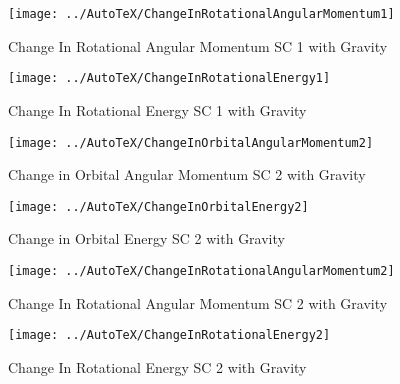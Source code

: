 \begin{figure}[htbp]
	\centerline{
		\texttt{[image: ../AutoTeX/ChangeInRotationalAngularMomentum1]}}
	\caption{Change In Rotational Angular Momentum SC 1 with Gravity}
	\label{fig:ChangeInRotationalAngularMomentum1}
\end{figure}

\begin{figure}[htbp]
	\centerline{
		\texttt{[image: ../AutoTeX/ChangeInRotationalEnergy1]}}
	\caption{Change In Rotational Energy SC 1 with Gravity}
	\label{fig:ChangeInRotationalEnergy1}
\end{figure}

\begin{figure}[htbp]
	\centerline{
		\texttt{[image: ../AutoTeX/ChangeInOrbitalAngularMomentum2]}}
	\caption{Change in Orbital Angular Momentum SC 2 with Gravity}
	\label{fig:ChangeInOrbitalAngularMomentum2}
\end{figure}

\begin{figure}[htbp]
	\centerline{
		\texttt{[image: ../AutoTeX/ChangeInOrbitalEnergy2]}}
	\caption{Change in Orbital Energy SC 2 with Gravity}
	\label{fig:ChangeInOrbitalEnergy2}
\end{figure}

\begin{figure}[htbp]
	\centerline{
		\texttt{[image: ../AutoTeX/ChangeInRotationalAngularMomentum2]}}
	\caption{Change In Rotational Angular Momentum SC 2 with Gravity}
	\label{fig:ChangeInRotationalAngularMomentum2}
\end{figure}

\begin{figure}[htbp]
	\centerline{
		\texttt{[image: ../AutoTeX/ChangeInRotationalEnergy2]}}
	\caption{Change In Rotational Energy SC 2 with Gravity}
	\label{fig:ChangeInRotationalEnergy2}
\end{figure}

\clearpage
